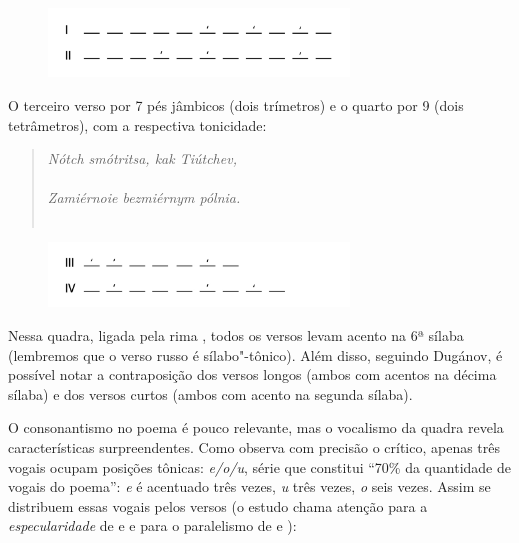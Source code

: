\begin{figure}[!ht]

  \includegraphics[width=80mm]{./imgs/grafico1.jpg}
 \end{figure}


O terceiro verso por 7 pés jâmbicos (dois trímetros) e o quarto por 9
(dois tetrâmetros), com a respectiva tonicidade:

\pagebreak

\begin{verse}
\emph{Nótch smótritsa, kak Tiútchev,} \\
{} \\[8pt]
\emph{Zamiérnoie bezmiérnym pólnia.} \\ 
{} \\[8pt]
\end{verse}


\begin{figure}[!ht]
  \includegraphics[width=80mm]{./imgs/grafico2.jpg}
 \end{figure}

Nessa quadra, ligada pela rima , todos os versos levam acento na 6ª
sílaba (lembremos que o verso russo é sílabo"-tônico). Além disso,
seguindo Dugánov, é possível notar a contraposição dos versos longos
(ambos com acentos na décima sílaba) e dos versos curtos (ambos com
acento na segunda sílaba).

O consonantismo no poema é pouco relevante, mas o vocalismo da quadra revela características surpreendentes.
Como observa com precisão o crítico, apenas três vogais ocupam posições tônicas: \emph{e/o/u},
série que constitui ``70\% da quantidade de vogais do poema'': \emph{e} é acentuado três vezes, \emph{u}
três vezes, \emph{o} seis vezes. Assim se distribuem essas vogais pelos versos (o estudo chama atenção para a
\emph{especularidade} de  e  e para o paralelismo de  e ):

